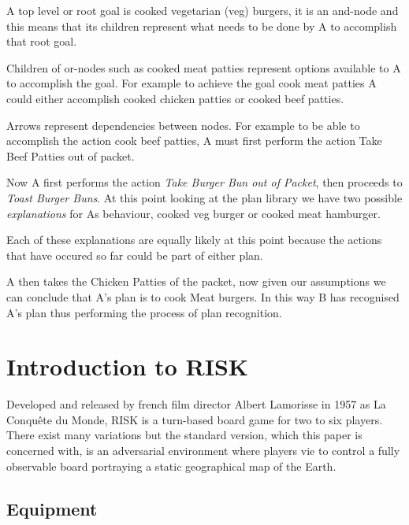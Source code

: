 \documentclass[parskip]{cs4rep}
\begin{document}
A top level or root goal is cooked vegetarian (veg) burgers, it is an and-node and this means that its children represent what needs to be done by A to accomplish that root goal. 

Children of or-nodes such as cooked meat patties represent options available to A to accomplish the goal. For example to achieve the goal cook meat patties A could either accomplish cooked chicken patties or cooked beef patties.

Arrows represent dependencies between nodes. For example to be able to accomplish the action cook beef patties, A must first perform the action Take Beef Patties out of packet.

Now A first performs the action \textit{Take Burger Bun out of Packet}, then proceeds to \textit{Toast Burger Buns}. At this point looking at the plan library we have two possible \textit{explanations} for As behaviour, cooked veg burger or cooked meat hamburger.

Each of these explanations are equally likely at this point because the actions that have occured so far could be part of either plan.

A then takes the Chicken Patties of the packet, now given our assumptions we can conclude that A's plan is to cook Meat burgers. In this way B has recognised A's plan thus performing the process of plan recognition.

\newpage

\section{Introduction to RISK}

Developed and released by french film director Albert Lamorisse in 1957 as La Conqu\^ete du Monde, RISK is a turn-based board game for two to six players. There exist many variations but the standard version, which this paper is concerned with, is an adversarial environment where players vie to control a fully observable board portraying a static geographical map of the Earth.

\subsection{Equipment}
\end{document}
